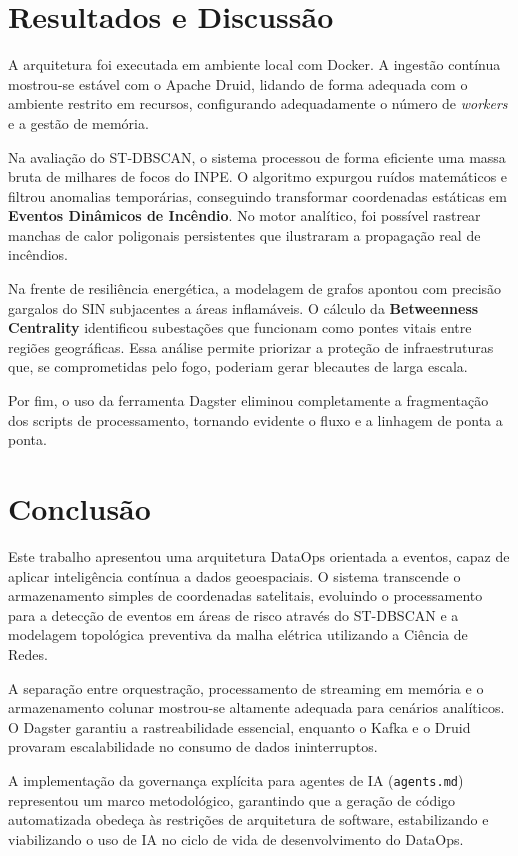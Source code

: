 \documentclass[12pt]{article}
\begin{document}
\section{Resultados e Discussão}

A arquitetura foi executada em ambiente local com Docker. A ingestão contínua mostrou-se estável com o Apache Druid, lidando de forma adequada com o ambiente restrito em recursos, configurando adequadamente o número de \textit{workers} e a gestão de memória.

Na avaliação do ST-DBSCAN, o sistema processou de forma eficiente uma massa bruta de milhares de focos do INPE. O algoritmo expurgou ruídos matemáticos e filtrou anomalias temporárias, conseguindo transformar coordenadas estáticas em \textbf{Eventos Dinâmicos de Incêndio}. No motor analítico, foi possível rastrear manchas de calor poligonais persistentes que ilustraram a propagação real de incêndios.

Na frente de resiliência energética, a modelagem de grafos apontou com precisão gargalos do SIN subjacentes a áreas inflamáveis. O cálculo da \textbf{Betweenness Centrality} identificou subestações que funcionam como pontes vitais entre regiões geográficas. Essa análise permite priorizar a proteção de infraestruturas que, se comprometidas pelo fogo, poderiam gerar blecautes de larga escala.

Por fim, o uso da ferramenta Dagster eliminou completamente a fragmentação dos scripts de processamento, tornando evidente o fluxo e a linhagem de ponta a ponta. 

\section{Conclusão}

Este trabalho apresentou uma arquitetura DataOps orientada a eventos, capaz de aplicar inteligência contínua a dados geoespaciais. O sistema transcende o armazenamento simples de coordenadas satelitais, evoluindo o processamento para a detecção de eventos em áreas de risco através do ST-DBSCAN e a modelagem topológica preventiva da malha elétrica utilizando a Ciência de Redes.

A separação entre orquestração, processamento de streaming em memória e o armazenamento colunar mostrou-se altamente adequada para cenários analíticos. O Dagster garantiu a rastreabilidade essencial, enquanto o Kafka e o Druid provaram escalabilidade no consumo de dados ininterruptos.

A implementação da governança explícita para agentes de IA (\texttt{agents.md}) representou um marco metodológico, garantindo que a geração de código automatizada obedeça às restrições de arquitetura de software, estabilizando e viabilizando o uso de IA no ciclo de vida de desenvolvimento do DataOps.
\end{document}
